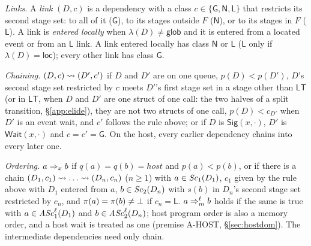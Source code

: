 \begin{definition}
\emph{Links.} A \emph{link} $(D,c)$ is a dependency with a class $c \in \{\mathsf{G},\mathsf{N},\mathsf{L}\}$ that
restricts its second stage set: to all of it ($\mathsf{G}$), to its stages outside $F$ ($\mathsf{N}$), or to its
stages in $F$ ($\mathsf{L}$). A link is \emph{entered locally} when $\lambda(D) \ne \mathsf{glob}$ and it is entered
from a located event or from an $\mathsf{L}$ link. A link entered locally has class $\mathsf{N}$ or $\mathsf{L}$
($\mathsf{L}$ only if $\lambda(D) = \mathsf{loc}$); every other link has class $\mathsf{G}$.

\emph{Chaining.} $(D,c) \rightsquigarrow (D',c')$ if $D$ and $D'$ are on one queue, $p(D) < p(D')$, $D$'s second stage set
restricted by $c$ meets $D'$'s first stage set in a stage other than $\mathsf{LT}$ (or in $\mathsf{LT}$, when
$D$ and $D'$ are one struct of one call: the two halves of a split transition, \S\ref{app:elide}), they are not two
structs of one call, $p(D) < c_{D'}$ when $D'$ is an event wait, and $c'$ follows the rule above; or if $D$ is $\mathsf{Sig}(x,\cdot)$, $D'$ is $\mathsf{Wait}(x,\cdot)$
and $c = c' = \mathsf{G}$. On the host, every earlier dependency chains into every later one.

\emph{Ordering.} $a \Rightarrow_{x} b$ if $q(a) = q(b) = \mathit{host}$ and $p(a) < p(b)$, or if there is a chain $(D_1,c_1)
\chainto \dots \chainto (D_n,c_n)$ ($n \ge 1$) with $a \in \mathit{Sc}_{1}(D_1)$, $c_1$ given by the rule above with $D_1$
entered from $a$, $b \in \mathit{Sc}_{2}(D_n)$ with $s(b)$ in $D_n$'s second stage set restricted by $c_n$, and
$\pi(a) = \pi(b) \ne \bot$ if $c_n = \mathsf{L}$. $a \Rightarrow_{m}^{\ell} b$ holds if the same is true with $a \in
\mathit{ASc}_{1}^{\ell}(D_1)$ and $b \in \mathit{ASc}_{2}^{\ell}(D_n)$; host program order is also a memory order, and a host wait is
treated as one (premise A-HOST, \S\ref{sec:hostdom}). The intermediate dependencies need only chain.


\end{definition}
